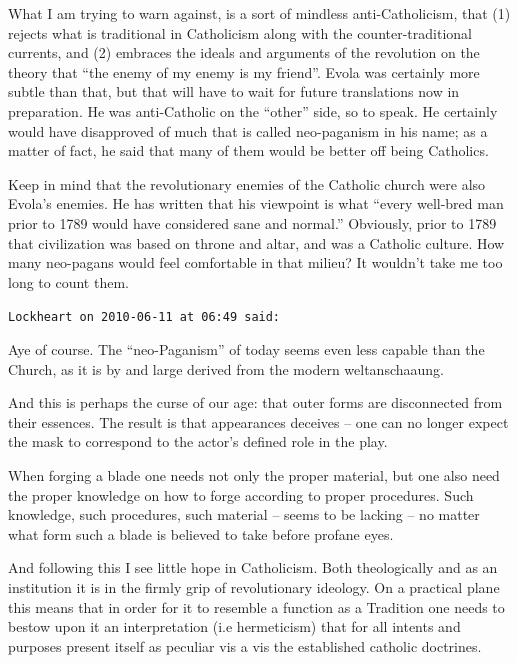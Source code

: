 \begin{footnotesize}
\begin{sffamily}
What I am trying to warn against, is a sort of mindless anti-Catholicism, that (1) rejects what is traditional in Catholicism along with the counter-traditional currents, and (2) embraces the ideals and arguments of the revolution on the theory that ``the enemy of my enemy is my friend''. Evola was certainly more subtle than that, but that will have to wait for future translations now in preparation. He was anti-Catholic on the ``other'' side, so to speak. He certainly would have disapproved of much that is called neo-paganism in his name; as a matter of fact, he said that many of them would be better off being Catholics.

Keep in mind that the revolutionary enemies of the Catholic church were also Evola's enemies. He has written that his viewpoint is what ``every well-bred man prior to 1789 would have considered sane and normal.'' Obviously, prior to 1789 that civilization was based on throne and altar, and was a Catholic culture. How many neo-pagans would feel comfortable in that milieu? It wouldn't take me too long to count them.

\hfill

\texttt{Lockheart on 2010-06-11 at 06:49 said:}

Aye of course. The ``neo-Paganism'' of today seems even less capable than the Church, as it is by and large derived from the modern weltanschaaung.

And this is perhaps the curse of our age: that outer forms are disconnected from their essences. The result is that appearances deceives -- one can no longer expect the mask to correspond to the actor's defined role in the play.

When forging a blade one needs not only the proper material, but one also need the proper knowledge on how to forge according to proper procedures. Such knowledge, such procedures, such material -- seems to be lacking -- no matter what form such a blade is believed to take before profane eyes.

And following this I see little hope in Catholicism. Both theologically and as an institution it is in the firmly grip of revolutionary ideology. On a practical plane this means that in order for it to resemble a function as a Tradition one needs to bestow upon it an interpretation (i.e hermeticism) that for all intents and purposes present itself as peculiar vis a vis the established catholic doctrines.


\hfill

\end{sffamily}
\end{footnotesize}

